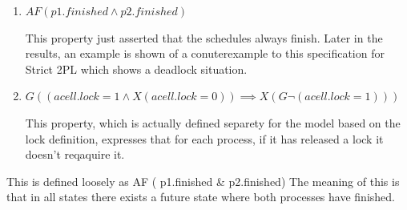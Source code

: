\begin{enumerate}
	\item $AF (p1.finished \land p2.finished)$

	This property just asserted that the schedules always finish. Later in the results, an example is shown of a conuterexample to this specification for Strict 2PL which shows a deadlock situation.

	\item $G (( acell.lock = 1 \land X ( acell.lock = 0)) \implies X(G \neg (acell.lock = 1)))$

		This property, which is actually defined separety for the model based on the lock definition, expresses that for each process, if it has released a lock it doesn't reqaquire it.

\end{enumerate}

This is defined loosely as 
AF ( p1.finished \& p2.finished)
The meaning of this is that in all states there exists a future state where both processes have finished.


